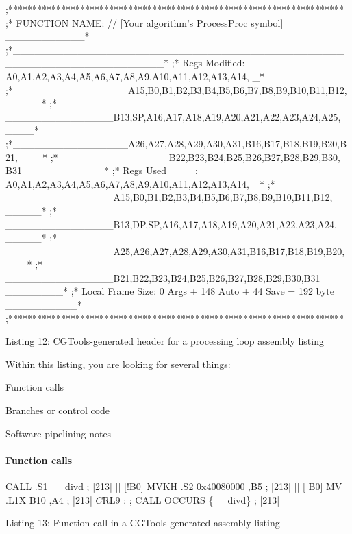 \begin{DoxyCode}
;**********************************************************************
;* FUNCTION NAME: \textcolor{comment}{// [Your algorithm's ProcessProc symbol] \_\_\_\_\_\_\_\_\_\_\_*}
;*\_\_\_\_\_\_\_\_\_\_\_\_\_\_\_\_\_\_\_\_\_\_\_\_\_\_\_\_\_\_\_\_\_\_\_\_\_\_\_\_\_\_\_\_\_\_\_\_\_\_\_\_\_\_\_\_\_\_\_\_\_\_\_\_\_\_\_\_*
;* Regs Modified: A0,A1,A2,A3,A4,A5,A6,A7,A8,A9,A10,A11,A12,A13,A14, \_*
;*\_\_\_\_\_\_\_\_\_\_\_\_\_\_\_\_A15,B0,B1,B2,B3,B4,B5,B6,B7,B8,B9,B10,B11,B12, \_\_\_\_\_*
;* \_\_\_\_\_\_\_\_\_\_\_\_\_\_\_B13,SP,A16,A17,A18,A19,A20,A21,A22,A23,A24,A25, \_\_\_\_*
;*\_\_\_\_\_\_\_\_\_\_\_\_\_\_\_\_A26,A27,A28,A29,A30,A31,B16,B17,B18,B19,B20,B21, \_\_\_*
;* \_\_\_\_\_\_\_\_\_\_\_\_\_\_\_B22,B23,B24,B25,B26,B27,B28,B29,B30, B31 \_\_\_\_\_\_\_\_\_\_\_*
;* Regs Used\_\_\_\_: A0,A1,A2,A3,A4,A5,A6,A7,A8,A9,A10,A11,A12,A13,A14, \_*
;* \_\_\_\_\_\_\_\_\_\_\_\_\_\_\_A15,B0,B1,B2,B3,B4,B5,B6,B7,B8,B9,B10,B11,B12, \_\_\_\_\_*
;* \_\_\_\_\_\_\_\_\_\_\_\_\_\_\_B13,DP,SP,A16,A17,A18,A19,A20,A21,A22,A23,A24, \_\_\_\_\_*
;* \_\_\_\_\_\_\_\_\_\_\_\_\_\_\_A25,A26,A27,A28,A29,A30,A31,B16,B17,B18,B19,B20, \_\_\_*
;* \_\_\_\_\_\_\_\_\_\_\_\_\_\_\_B21,B22,B23,B24,B25,B26,B27,B28,B29,B30,B31 \_\_\_\_\_\_\_\_*
;* Local Frame Size: 0 Args + 148 Auto + 44 Save = 192 byte \_\_\_\_\_\_\_\_\_\_*
;********************************************************************** 
\end{DoxyCode}
  Listing 12\+: C\+G\+Tools-\/generated header for a processing loop assembly listing

Within this listing, you are looking for several things\+: 
\begin{DoxyEnumerate}
\item Function calls  
\item Branches or control code  
\item Software pipelining notes  
\end{DoxyEnumerate}

\hypertarget{a00362_subsubsection__function_calls_}{}\paragraph{Function calls}\label{a00362_subsubsection__function_calls_}



\begin{DoxyCode}
   [!B0]  CALL  .S1   \_\_divd         ; |213|
|| [!B0]  MVKH  .S2   0x40080000 ,B5 ; |213|
|| [ B0]  MV    .L1X  B10 ,A4        ; |213|
$C$RL9 : ; CALL OCCURS \{\_\_divd\}      ; |213| 
\end{DoxyCode}
  Listing 13\+: Function call in a C\+G\+Tools-\/generated assembly listing

